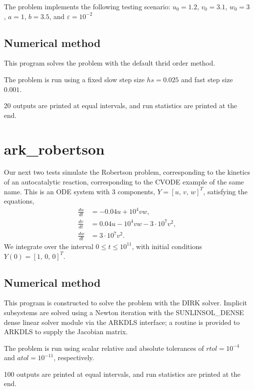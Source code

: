 \documentclass[letterpaper,10pt,english]{sphinxmanual}
\begin{document}
The problem implements the following testing scenario: \(u_0=1.2\),
\(v_0=3.1\),  \(w_0=3\), \(a=1\), \(b=3.5\), and
\(\varepsilon=10^{-2}\)


\subsection{Numerical method}
\label{\detokenize{c_serial:id11}}
This program solves the problem with the default thrid order method.

The problem is run using a fixed slow step size \(hs=0.025\) and fast step
size \(0.001\).

20 outputs are printed at equal intervals, and run statistics
are printed at the end.


\section{ark\_robertson}
\label{\detokenize{c_serial:id12}}\label{\detokenize{c_serial:ark-robertson}}
Our next two tests simulate the Robertson problem, corresponding to the
kinetics of an autocatalytic reaction, corresponding to the CVODE
example of the same name.  This is an ODE system with 3
components, \(Y = [u,\, v,\, w]^T\), satisfying the equations,
\begin{equation*}
\begin{split}\frac{du}{dt} &= -0.04 u + 10^4 v w, \\
\frac{dv}{dt} &= 0.04 u - 10^4 v w - 3\cdot10^7 v^2, \\
\frac{dw}{dt} &= 3\cdot10^7 v^2.\end{split}
\end{equation*}
We integrate over the interval \(0\le t\le 10^{11}\), with initial
conditions  \(Y(0) = [1,\, 0,\, 0]^T\).


\subsection{Numerical method}
\label{\detokenize{c_serial:id13}}
This program is constructed to solve the problem with the DIRK solver.
Implicit subsystems are solved using a Newton iteration with the
SUNLINSOL\_DENSE dense linear solver module via the ARKDLS interface; a
routine is provided to ARKDLS to supply the Jacobian matrix.

The problem is run using scalar relative and absolute tolerances of
\(rtol=10^{-4}\) and \(atol=10^{-11}\), respectively.

100 outputs are printed at equal intervals, and run statistics are
printed at the end.
\end{document}
